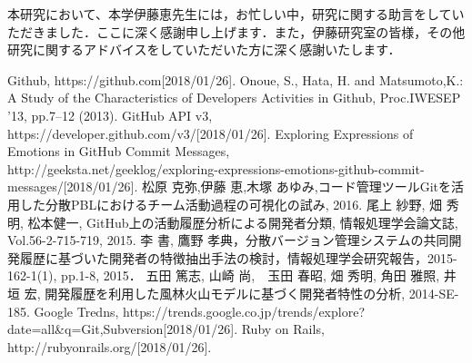 \documentclass{funthesis}
\begin{document}
本研究において、本学伊藤恵先生には，お忙しい中，研究に関する助言をしていただきました．ここに深く感謝申し上げます．また，伊藤研究室の皆様，その他研究に関するアドバイスをしていただいた方に深く感謝いたします．
\begin{thebibliography}{20}
  Github, https://github.com[2018/01/26].
  Onoue, S., Hata, H. and Matsumoto,K.: A Study of the Characteristics of Developers Activities in Github, Proc.IWESEP ’13, pp.7–12 (2013).
  GitHub API v3, https://developer.github.com/v3/[2018/01/26].
 Exploring Expressions of Emotions in GitHub Commit Messages,
\\ http://geeksta.net/geeklog/exploring-expressions-emotions-github-commit-messages/[2018/01/26].
  松原 克弥,伊藤 恵,木塚 あゆみ,コード管理ツールGitを活用した分散PBLにおけるチーム活動過程の可視化の試み, 2016.
  尾上 紗野, 畑 秀明, 松本健一, GitHub上の活動履歴分析による開発者分類, 情報処理学会論文誌, Vol.56-2-715-719, 2015.
  李 書, 鷹野 孝典，分散バージョン管理システムの共同開発履歴に基づいた開発者の特徴抽出手法の検討，情報処理学会研究報告，2015-162-1(1), pp.1-8, 2015．
 五田 篤志, 山崎 尚,　玉田 春昭, 畑 秀明, 角田 雅照, 井垣 宏, 開発履歴を利用した風林火山モデルに基づく開発者特性の分析, 2014-SE-185.
 Google Tredns, https://trends.google.co.jp/trends/explore?date=all\&q=Git,Subversion[2018/01/26].
 Ruby on Rails, http://rubyonrails.org/[2018/01/26].
\end{thebibliography}


\appendix

\listoffigures

\listoftables
\end{document}
